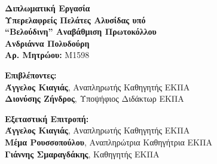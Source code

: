 \begin{center}
    \vspace{3cm}
    \large \textbf{Διπλωματική Εργασία}\\
    \vspace{3cm}
    \textbf{Υπερελαφρείς Πελάτες Αλυσίδας υπό \\
    ``Βελούδινη'' Aναβάθμιση Πρωτοκόλλου}\\
    \vspace{3cm}
    \large \textbf{Ανδριάννα Πολυδούρη}\\
    \textbf{Αρ. Μητρώου:} M1598
 
    \begin{flushleft}
        \textbf{Επιβλέποντες:}\\ 
        \hspace{2cm}
        \textbf{Άγγελος Κιαγιάς}, Αναπληρωτής Καθηγητής ΕΚΠΑ\\
        \hspace{2cm}
        \textbf{Διονύσης Ζήνδρος}, Υποψήφιος Διδάκτωρ ΕΚΠΑ

        \textbf{Εξεταστική Επιτροπή:}\\ 
        \hspace{2cm}
        \textbf{Άγγελος Κιαγιάς}, Αναπληρωτής Καθηγητής ΕΚΠΑ\\
        \hspace{2cm}
        \textbf{Μέμα Ρουσσοπούλου}, Αναπληρώτρια Καθηγήτρια ΕΚΠΑ\\
        \hspace{2cm}
        \textbf{Γιάννης Σμαραγδάκης}, Καθηγητής ΕΚΠΑ

    \end{flushleft}
\end{center}


\pagebreak